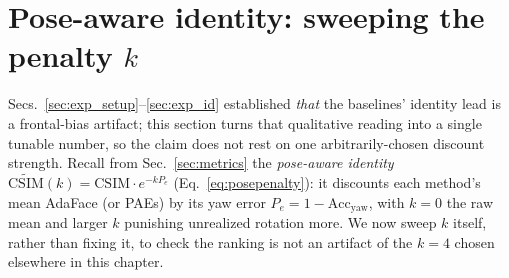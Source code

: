 \begin{table}[t]\centering\small
\setlength{\tabcolsep}{5pt}
\caption[Identity ablation]{\textbf{Identity ablation} ($1400$ generations): mean AdaFace and PAEs CSIM
over detected faces, \emph{raw} and \emph{pose-aware}
$\widetilde{\mathrm{CSIM}}{=}\mathrm{CSIM}\cdot e^{-4P_e}$ at $k{=}4$
(Eq.~\ref{eq:posepenalty}). From the naive FLUX.2 base (identity image\,+\,prompt,
no structural control), \dupid{} and the learned gate recover identity
\emph{purely by reallocating attention to the reference}---no prompt edit. All three
configurations rotate comparably ($73.6$--$82.9\%$ yaw), so the gains persist under
the pose-aware discount.}
\label{tab:id_bins}
\end{table}

\FloatBarrier
\section{Pose-aware identity: sweeping the penalty $k$}
\label{sec:exp_penalized}
Secs.~\ref{sec:exp_setup}--\ref{sec:exp_id} established \emph{that} the
baselines' identity lead is a frontal-bias artifact; this section turns that
qualitative reading into a single tunable number, so the claim does not rest
on one arbitrarily-chosen discount strength. Recall from Sec.~\ref{sec:metrics}
the \emph{pose-aware identity}
$\widetilde{\mathrm{CSIM}}(k)=\mathrm{CSIM}\cdot e^{-k P_e}$
(Eq.~\ref{eq:posepenalty}): it discounts each method's mean AdaFace (or PAEs)
\csim{} by its yaw error $P_e{=}1-\mathrm{Acc_{yaw}}$, with $k{=}0$ the raw mean and
larger $k$ punishing unrealized rotation more. We now sweep $k$ itself, rather
than fixing it, to check the ranking is not an artifact of the $k{=}4$ chosen
elsewhere in this chapter.

